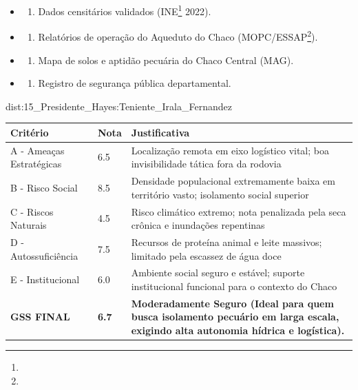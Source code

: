 {\begin{itemize}
\tightlist
\item
  \begin{enumerate}
  \def\labelenumi{\arabic{enumi})}
  \tightlist
  \item
    Dados censitários validados (INE\footnote{\fineINE} 2022).
  \end{enumerate}
\item
  \begin{enumerate}
  \def\labelenumi{\arabic{enumi})}
  \setcounter{enumi}{1}
  \tightlist
  \item
    Relatórios de operação do Aqueduto do Chaco (MOPC/\allowbreak ESSAP\footnote{\fineESSAP}).
  \end{enumerate}
\item
  \begin{enumerate}
  \def\labelenumi{\arabic{enumi})}
  \setcounter{enumi}{2}
  \tightlist
  \item
    Mapa de solos e aptidão pecuária do Chaco Central (MAG).
  \end{enumerate}
\item
  \begin{enumerate}
  \def\labelenumi{\arabic{enumi})}
  \setcounter{enumi}{3}
  \tightlist
  \item
    Registro de segurança pública departamental.
  \end{enumerate}
\end{itemize}}{dist:15_Presidente_Hayes:Teniente_Irala_Fernandez}
\begin{table}[ht!]
\small \begin{tabular}{p{3.0cm}p{0.8cm}p{6.0cm}} \toprule
\textbf{Critério} & \textbf{Nota} & \textbf{Justificativa} \\ \midrule
A - Ameaças Estratégicas & 6.5 & Localização remota em eixo logístico vital; boa invisibilidade tática fora da rodovia \\
B - Risco Social & 8.5 & Densidade populacional extremamente baixa em território vasto; isolamento social superior \\
C - Riscos Naturais & 4.5 & Risco climático extremo; nota penalizada pela seca crônica e inundações repentinas \\
D - Autossuficiência & 7.5 & Recursos de proteína animal e leite massivos; limitado pela escassez de água doce \\
E - Institucional & 6.0 & Ambiente social seguro e estável; suporte institucional funcional para o contexto do Chaco \\
\midrule \textbf{GSS FINAL} & \textbf{6.7} & \textbf{Moderadamente Seguro (Ideal para quem busca isolamento pecuário em larga escala, exigindo alta autonomia hídrica e logística).} \\ \bottomrule \end{tabular}
\end{table}
